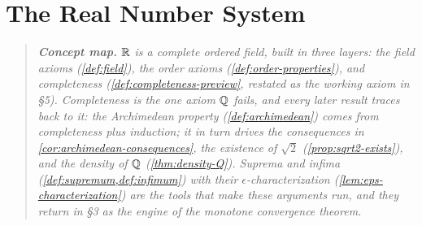
\section{The Real Number System}

\begin{quote}\small\itshape
\textbf{Concept map.}
$\mathbb{R}$ is a \emph{complete ordered field}, built in three layers:
the field axioms (\cref{def:field}), the order axioms
(\cref{def:order-properties}), and completeness
(\cref{def:completeness-preview}, restated as the working axiom in
\S5). Completeness is the one axiom $\mathbb{Q}$ fails, and every later result
traces back to it: the Archimedean property (\cref{def:archimedean})
comes from completeness plus induction; it in turn drives the
consequences in \cref{cor:archimedean-consequences}, the existence of
$\sqrt2$ (\cref{prop:sqrt2-exists}), and the density of $\mathbb{Q}$
(\cref{thm:density-Q}). Suprema and infima
(\cref{def:supremum,def:infimum}) with their $\epsilon$-characterization
(\cref{lem:eps-characterization}) are the tools that make these
arguments run, and they return in \S3 as the engine of the monotone
convergence theorem.
\end{quote}






